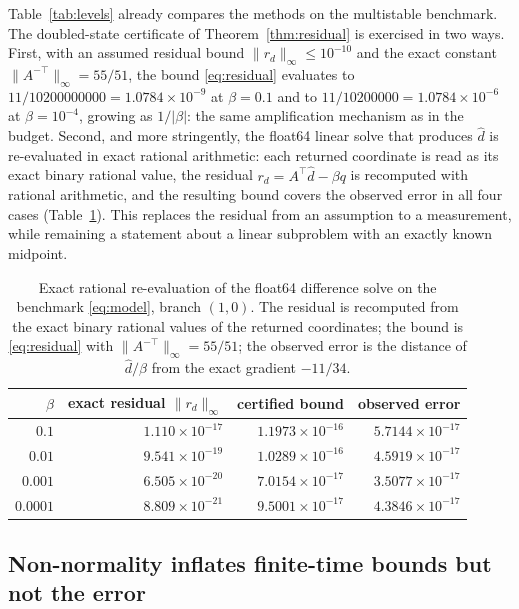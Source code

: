 \documentclass[11pt]{article}
\theoremstyle{definition}
\theoremstyle{remark}
\newcommand{\norm}[1]{\lVert #1 \rVert}
\newcommand{\abs}[1]{\lvert #1 \rvert}
\begin{document}
Table~\ref{tab:levels} already compares the methods on the multistable benchmark. The doubled-state
certificate of Theorem~\ref{thm:residual} is exercised in two ways. First, with an assumed residual
bound $\norm{r_d}_{\infty} \le 10^{-10}$ and the exact constant $\norm{A^{-\top}}_{\infty} = 55/51$,
the bound \eqref{eq:residual} evaluates to $11/10200000000 = 1.0784\times10^{-9}$ at
$\beta = 0.1$ and to $11/10200000 = 1.0784\times10^{-6}$ at $\beta = 10^{-4}$, growing as
$1/\abs{\beta}$: the same amplification mechanism as in the budget. Second, and more stringently,
the float64 linear solve that produces $\widehat d$ is re-evaluated in exact rational arithmetic:
each returned coordinate is read as its exact binary rational value, the residual
$r_d = A^{\top}\widehat d - \beta q$ is recomputed with rational arithmetic, and the resulting
bound covers the observed error in all four cases (Table~\ref{tab:dyadic}). This replaces the
residual from an assumption to a measurement, while remaining a statement about a linear
subproblem with an exactly known midpoint.

\begin{table}[t]
\centering
\small
\caption{Exact rational re-evaluation of the float64 difference solve on the benchmark
\eqref{eq:model}, branch $(1,0)$. The residual is recomputed from the exact binary rational values
of the returned coordinates; the bound is \eqref{eq:residual} with
$\norm{A^{-\top}}_{\infty} = 55/51$; the observed error is the distance of $\widehat d/\beta$ from
the exact gradient $-11/34$.}
\label{tab:dyadic}
\begin{tabular}{rrrr}
\toprule
$\beta$ & exact residual $\norm{r_d}_\infty$ & certified bound & observed error \\
\midrule
$0.1$ & $1.110\times10^{-17}$ & $1.1973\times10^{-16}$ & $5.7144\times10^{-17}$ \\
$0.01$ & $9.541\times10^{-19}$ & $1.0289\times10^{-16}$ & $4.5919\times10^{-17}$ \\
$0.001$ & $6.505\times10^{-20}$ & $7.0154\times10^{-17}$ & $3.5077\times10^{-17}$ \\
$0.0001$ & $8.809\times10^{-21}$ & $9.5001\times10^{-17}$ & $4.3846\times10^{-17}$ \\
\bottomrule
\end{tabular}
\end{table}

\subsection{Non-normality inflates finite-time bounds but not the error}
\label{sec:nonnormal}
\end{document}
